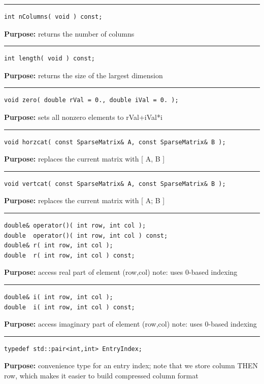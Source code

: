 \documentclass{article}
\begin{document}
\hspace{-.21in}\rule{5in}{1pt}
\begin{verbatim}
int nColumns( void ) const;
\end{verbatim}
\textbf{Purpose:}
returns the number of columns

\hspace{-.21in}\rule{5in}{1pt}
\begin{verbatim}
int length( void ) const;
\end{verbatim}
\textbf{Purpose:}
returns the size of the largest dimension

\hspace{-.21in}\rule{5in}{1pt}
\begin{verbatim}
void zero( double rVal = 0., double iVal = 0. );
\end{verbatim}
\textbf{Purpose:}
sets all nonzero elements to rVal+iVal*i

\hspace{-.21in}\rule{5in}{1pt}
\begin{verbatim}
void horzcat( const SparseMatrix& A, const SparseMatrix& B );
\end{verbatim}
\textbf{Purpose:}
replaces the current matrix with [ A, B ]

\hspace{-.21in}\rule{5in}{1pt}
\begin{verbatim}
void vertcat( const SparseMatrix& A, const SparseMatrix& B );
\end{verbatim}
\textbf{Purpose:}
replaces the current matrix with [ A; B ]

\hspace{-.21in}\rule{5in}{1pt}
\begin{verbatim}
double& operator()( int row, int col );
double  operator()( int row, int col ) const;
double& r( int row, int col );
double  r( int row, int col ) const;
\end{verbatim}
\textbf{Purpose:}
access real part of element (row,col)
note: uses 0-based indexing

\hspace{-.21in}\rule{5in}{1pt}
\begin{verbatim}
double& i( int row, int col );
double  i( int row, int col ) const;
\end{verbatim}
\textbf{Purpose:}
access imaginary part of element (row,col)
note: uses 0-based indexing

\hspace{-.21in}\rule{5in}{1pt}
\begin{verbatim}
typedef std::pair<int,int> EntryIndex;
\end{verbatim}
\textbf{Purpose:}
convenience type for an entry index; note that we store column THEN
row, which makes it easier to build compressed column format
\end{document}

